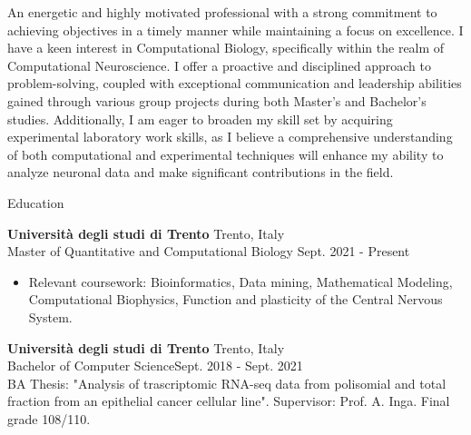 \documentclass{resume} %
\begin{document}
\begin{rSection}{}
      An energetic and highly motivated professional with a strong commitment to achieving objectives in a timely manner while maintaining a focus on excellence.
      I have a keen interest in Computational Biology, specifically within the realm of Computational Neuroscience.
      I offer a proactive and disciplined approach to problem-solving, coupled with exceptional communication and leadership abilities gained through various group projects during both Master's and Bachelor's studies.
      Additionally, I am eager to broaden my skill set by acquiring experimental laboratory work skills, as I believe a comprehensive understanding of both computational and experimental techniques will enhance my ability to analyze neuronal data and make significant contributions in the field.
\end{rSection}





\begin{rSection}{Education}

{\bf Universit\`a degli studi di Trento} \hfill {Trento, Italy}\\
Master of Quantitative and Computational Biology \hfill {Sept. 2021 - Present}
\begin{itemize}
   \item Relevant coursework: Bioinformatics, Data mining, Mathematical Modeling, Computational Biophysics, Function and plasticity of the Central Nervous System.
\end{itemize}

{\bf Universit\`a degli studi di Trento} \hfill {Trento, Italy}\\
Bachelor of Computer Science\hfill {Sept. 2018 - Sept. 2021}\\
BA Thesis: "Analysis of trascriptomic RNA-seq data from polisomial and total fraction from an epithelial cancer cellular line". Supervisor: Prof. A. Inga. Final grade 108/110.


\end{rSection}
\end{document}
